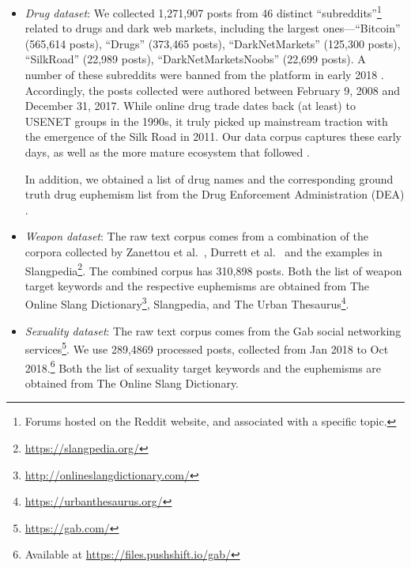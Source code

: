 \begin{itemize}%
	\item {\em Drug dataset}: We collected 1,271,907 posts from 46 distinct 
	``subreddits''\footnote{Forums hosted on the Reddit website, 
	and associated with a specific topic.} 
	related to drugs and dark web markets, 
	including the largest ones---``Bitcoin'' (565,614 posts), 
``Drugs'' (373,465 posts),
``DarkNetMarkets'' (125,300 posts),
``SilkRoad'' (22,989 posts), 
``DarkNetMarketsNoobs'' (22,699 posts). 
A number of these subreddits were banned from the platform 
in early 2018 \cite{cimpanu2018reddit}. 
Accordingly, the posts collected were authored between February 9, 2008 and December 31, 2017. 
While online drug trade dates back (at least) to USENET groups in the 1990s, 
it truly picked up mainstream traction with the emergence of the 
Silk Road in 2011. 
Our data corpus captures these early days, 
as well as the more mature ecosystem that followed 
\cite{soska15markets}.

	In addition, we obtained a list of drug names and the corresponding ground truth drug euphemism list from the Drug Enforcement Administration (DEA) \cite{drug2018slang}. 
	
	\item {\em Weapon dataset}: The raw text corpus comes from a combination of the 
	corpora collected by Zanettou et al.\ \cite{zannettou2018gab}, Durrett et al.\ \cite{durrett2017identifying} and the examples in Slangpedia\footnote{\url{https://slangpedia.org/}}. 
	The combined corpus has 310,898 posts. 
	Both the list of weapon target keywords and the respective euphemisms are obtained from The Online Slang Dictionary\footnote{\url{http://onlineslangdictionary.com/}}, Slangpedia, and The Urban Thesaurus\footnote{\url{https://urbanthesaurus.org/}}. 
	
	\item {\em Sexuality dataset}: The raw text corpus comes from the Gab social networking services\footnote{\url{https://gab.com/}}. We use 289,4869 processed posts, collected from Jan 2018 to Oct 2018.\footnote{Available at \url{https://files.pushshift.io/gab/}}
	Both the list of sexuality target keywords and the euphemisms are obtained from The Online Slang Dictionary. 
\end{itemize}


